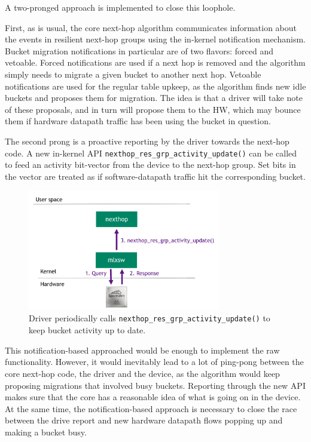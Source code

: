\documentclass[letterpaper]{article}
\begin{document}
A two-pronged approach is implemented to close this loophole.

First, as is usual, the core next-hop algorithm communicates information
about the events in resilient next-hop groups using the in-kernel
notification mechanism. Bucket migration notifications in particular are of
two flavors: forced and vetoable. Forced notifications are used if a next
hop is removed and the algorithm simply needs to migrate a given bucket to
another next hop. Vetoable notifications are used for the regular table
upkeep, as the algorithm finds new idle buckets and proposes them for
migration. The idea is that a driver will take note of these proposals, and
in turn will propose them to the HW, which may bounce them if hardware
datapath traffic has been using the bucket in question.

The second prong is a proactive reporting by the driver towards the
next-hop code. A new in-kernel API
\texttt{nexthop\_res\_grp\_activity\_update()} can be called to feed an
activity bit-vector from the device to the next-hop group. Set bits in the
vector are treated as if software-datapath traffic hit the corresponding
bucket.

\begin{figure}[H]
\includegraphics[width=3.31in]{nexthop_res_grp_activity_update.png}
\caption{Driver periodically calls
  \texttt{nexthop\_res\_grp\_activity\_update()} to keep bucket activity up
  to date.}
\label{fig:nexthop_res_grp_activity_update}
\end{figure}

This notification-based approached would be enough to implement the raw
functionality. However, it would inevitably lead to a lot of ping-pong
between the core next-hop code, the driver and the device, as the algorithm
would keep proposing migrations that involved busy buckets. Reporting
through the new API makes sure that the core has a reasonable idea of what
is going on in the device. At the same time, the notification-based
approach is necessary to close the race between the drive report and new
hardware datapath flows popping up and making a bucket busy.
\end{document}

